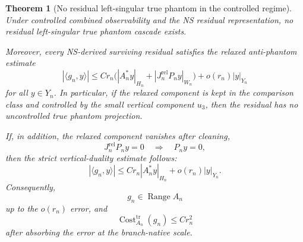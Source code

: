 \documentclass[11pt]{article}
\numberwithin{equation}{section}
\newtheorem{theorem}{Theorem}[section]
\begin{document}
\begin{theorem}[No residual left-singular true phantom in the controlled regime]
Under controlled combined observability and the NS residual representation, no residual left-singular true phantom cascade exists.

Moreover, every NS-derived surviving residual satisfies the relaxed anti-phantom estimate
\begin{equation}
|\langle g_n,y\rangle|
\le
C r_n
\Big(
|A_n^*y|_{H_n}
+
|J_n^{\mathrm{rel}}P_n y|_{W_n}
\Big)
+
o(r_n)|y|_{Y_n}
\label{eq:tag-10-253}
\end{equation}
for all \(y\in Y_n\). In particular, if the relaxed component is kept in the comparison class and controlled by the small vertical component \(u_3\), then the residual has no uncontrolled true phantom projection.

If, in addition, the relaxed component vanishes after cleaning,
\begin{equation}
J_n^{\mathrm{rel}}P_n y=0
\quad\Longrightarrow\quad
P_ny=0,
\label{eq:tag-10-254}
\end{equation}
then the strict vertical-duality estimate follows:
\begin{equation}
|\langle g_n,y\rangle|
\le
C r_n|A_n^*y|_{H_n}
+
o(r_n)|y|_{Y_n}.
\label{eq:tag-10-255}
\end{equation}
Consequently,
\[
g_n\in \operatorname{Range}A_n
\]
up to the \(o(r_n)\) error, and
\begin{equation}
\operatorname{Cost}^{\operatorname{tr}}_{A_n}(g_n)
\le
C r_n^2
\label{eq:tag-10-256}
\end{equation}
after absorbing the error at the branch-native scale.
\end{theorem}
\end{document}
